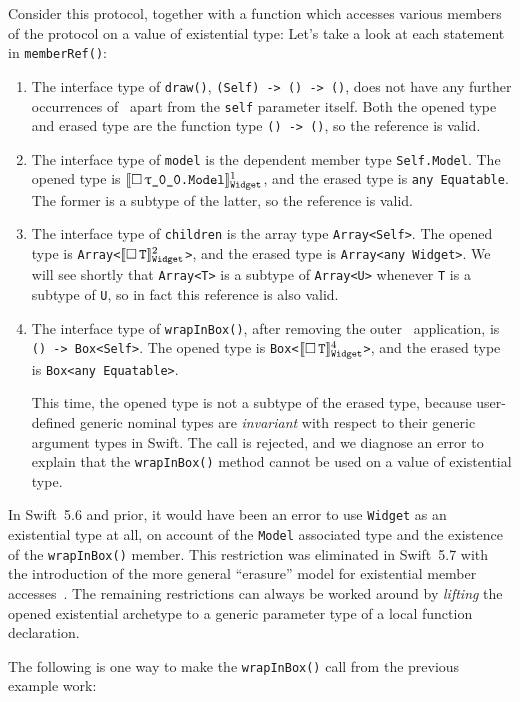 \documentclass[../generics]{subfiles}
\begin{document}
\begin{example}
Consider this protocol, together with a function which accesses various members of the protocol on a value of existential type:
Let's take a look at each statement in \texttt{memberRef()}:
\begin{enumerate}
\item The interface type of \texttt{draw()}, \texttt{(Self) -> () -> ()}, does not have any further occurrences of \tSelf\ apart from the \texttt{self} parameter itself. Both the opened type and erased type are the function type \texttt{() -> ()}, so the reference is valid.

\item The interface type of \texttt{model} is the dependent member type \texttt{Self.Model}. The opened type is \texttt{$\Exist{\rT.Model}^1_\texttt{Widget}$}, and the erased type is \texttt{any Equatable}. The former is a subtype of the latter, so the reference is valid.

\item The interface type of \texttt{children} is the array type \texttt{Array<Self>}. The opened type is \texttt{Array<$[\![\Box\,\texttt{T}]\!]^2_\texttt{Widget}$>}, and the erased type is \texttt{Array<any Widget>}. We will see shortly that \texttt{Array<T>} is a subtype of \texttt{Array<U>} whenever \texttt{T} is a subtype of \texttt{U}, so in fact this reference is also valid.

\item The interface type of \texttt{wrapInBox()}, after removing the outer \tSelf\ application, is \texttt{() -> Box<Self>}. The opened type is \texttt{Box<$[\![\Box\,\texttt{T}]\!]^4_\texttt{Widget}$>}, and the erased type is \texttt{Box<any Equatable>}.

This time, the opened type is not a subtype of the erased type, because user-defined generic nominal types are \emph{invariant} with respect to their generic argument types in Swift. The call is rejected, and we diagnose an error to explain that the \texttt{wrapInBox()} method cannot be used on a value of existential type.
\end{enumerate}
\end{example}
In Swift~5.6 and prior, it would have been an error to use \texttt{Widget} as an existential type at all, on account of the \texttt{Model} associated type and the existence of the \texttt{wrapInBox()} member. This restriction was eliminated in Swift~5.7 with the introduction of the more general ``erasure'' model for existential member accesses~\cite{se0309}. The remaining restrictions can always be worked around by \emph{lifting} the opened existential archetype to a generic parameter type of a local function declaration.
\begin{example}
The following is one way to make the \texttt{wrapInBox()} call from the previous example work:
\end{example}
\end{document}
